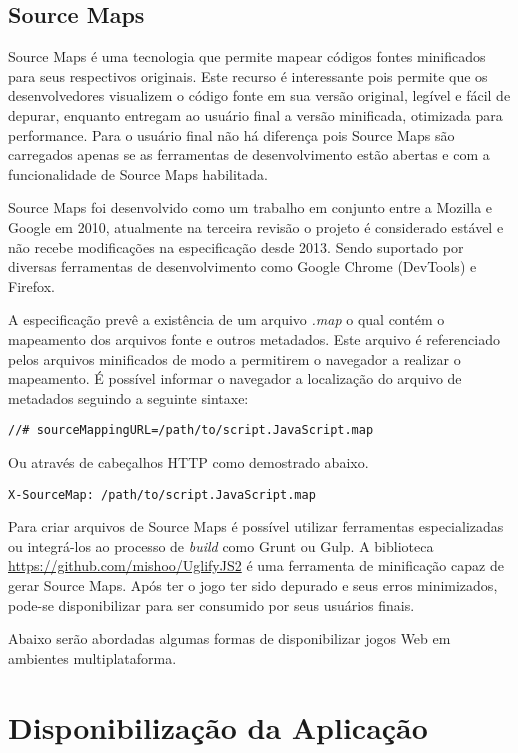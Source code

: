 \subsection{Source Maps}

Source Maps é uma tecnologia que permite mapear códigos fontes
minificados para seus respectivos originais. Este recurso é
interessante pois permite que os desenvolvedores visualizem o código
fonte em sua versão original, legível e fácil de depurar, enquanto
entregam ao usuário final a versão minificada, otimizada para
performance. Para o usuário final não há diferença pois Source Maps
são carregados apenas se as ferramentas de desenvolvimento estão
abertas e com a funcionalidade de Source Maps habilitada.

Source Maps foi desenvolvido como um trabalho em conjunto entre a
Mozilla e Google em 2010, atualmente na terceira revisão o projeto é
considerado estável e não recebe modificações na especificação
desde 2013. Sendo suportado por diversas ferramentas de desenvolvimento
como Google Chrome (DevTools) e Firefox.

A especificação prevê a existência de um arquivo \textit{.map} o
qual contém o mapeamento dos arquivos fonte e outros metadados. Este
arquivo é referenciado pelos arquivos minificados de modo a permitirem
o navegador a realizar o mapeamento. É possível informar o navegador a
localização do arquivo de metadados seguindo a seguinte sintaxe:

\begin{verbatim}
//# sourceMappingURL=/path/to/script.JavaScript.map
\end{verbatim}

Ou através de cabeçalhos HTTP como demostrado abaixo.

\begin{verbatim}
X-SourceMap: /path/to/script.JavaScript.map
\end{verbatim}

Para criar arquivos de Source Maps é possível utilizar ferramentas
especializadas ou integrá-los ao processo de \textit{build} como Grunt
ou Gulp. A biblioteca \url{https://github.com/mishoo/UglifyJS2} é uma
ferramenta de minificação capaz de gerar Source Maps. Após ter o jogo
ter sido depurado e seus erros minimizados, pode-se disponibilizar para
ser consumido por seus usuários finais.

Abaixo serão abordadas algumas formas de disponibilizar jogos Web em
ambientes multiplataforma.
\section{Disponibilização da Aplicação}\label{disponibilization}

